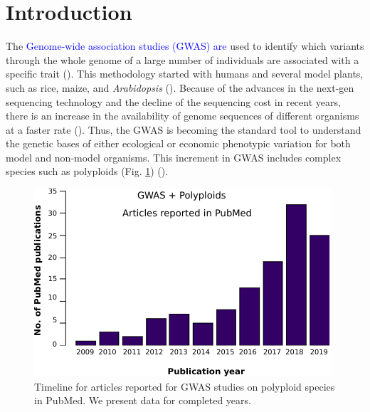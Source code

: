 \documentclass{article}
\begin{document}
\section{Introduction}

The \textcolor{blue}{Genome-wide association studies (GWAS) are} used to identify which variants through the whole genome of a large number of individuals are associated with a specific trait (\cite{cantor2010prioritizing,begum2012comprehensive}). This methodology started with humans and several model plants, such as rice, maize, and \emph{Arabidopsis} (\cite{lauc2010genomics,tian2011genome,cao2011whole,korte2013advantages,han2013sequencing}). Because of the advances in the next-gen sequencing technology and the decline of the sequencing cost in recent years, there is an increase in the availability of genome sequences of different organisms at a faster rate (\cite{ekblom2011applications,ellegren2014genome}). Thus, the GWAS is becoming the standard tool to understand the genetic bases of either ecological or economic phenotypic variation for both model and non-model organisms. This increment in GWAS includes complex species such as polyploids (Fig. \ref{GWASpolyploids}) (\cite{ekblom2011applications,santure2018wild}).

\begin{figure}[H]
\begin{centering}
\includegraphics{images/paper-GWASpolyploids-PubMed}
\par\end{centering}
\centering{}\caption{Timeline for articles reported for GWAS studies on polyploid species in PubMed. We present data for completed years.\label{GWASpolyploids}}
\end{figure}
\end{document}
